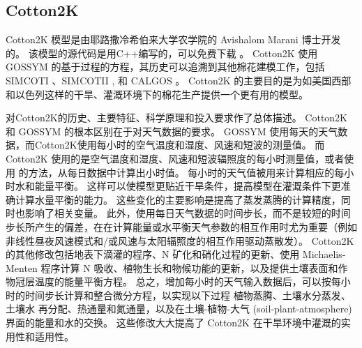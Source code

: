 \subsection{Cotton2K}
Cotton2K 模型是由耶路撒冷希伯来大学农学院的 Avishalom Marani 博士开发的。
该模型的源代码是用C++编写的，可以免费下载 \cite{cotton2kv4}。
Cotton2K 使用 GOSSYM \cite{baker1976,baker1983} 的基于过程的方程，其历史可以追溯到其他棉花建模工作，包括SIMCOTI \cite{baker1972}、SIMCOTII \cite{jones1974}, 和 CALGOS \cite{marani1992a,marani1992b,marani1992c}。
Cotton2K 的主要目的是为如美国西部和以色列这样的干旱、灌溉环境下的棉花生产提供一个更有用的模型。 

 对Cotton2K的历史、主要特征、科学原理和投入要求作了总体描述。
Cotton2K 和 GOSSYM 的根本区别在于对天气数据的要求。
GOSSYM 使用每天的天气数据，而Cotton2K使用每小时的空气温度和湿度、风速和短波的测量值。
而 Cotton2K 使用的是空气温度和湿度、风速和短波辐照度的每小时测量值，或者使用  的方法，从每日数据中计算出小时值。
每小时的天气值被用来计算相应的每小时水和能量平衡。
这样可以使模型更贴近干旱条件，提高模型在灌溉条件下更准确计算水量平衡的能力\cite{cotton2kv4}。
这些变化的主要影响是提高了蒸发蒸腾的计算精度，同时也影响了相关变量。
此外，使用每日天气数据的时间步长，而不是较短的时间步长所产生的偏差，在在计算能量或水平衡天气参数的相互作用时尤为重要（例如非线性昼夜风速模式和/或风速与太阳辐照度的相互作用驱动蒸散发）\cite{ephrath1996}。
Cotton2K 的其他修改包括地表下滴灌的程序、N 矿化和硝化过程的更新、使用 Michaelis-Menten 程序计算 N 吸收、植物生长和物候功能的更新，以及提供土壤表面和作物冠层温度的能量平衡方程\cite{cotton2kv4}。
总之，增加每小时的天气输入数据后，可以按每小时的时间步长计算和整合微分方程，以实现以下过程 植物蒸腾、土壤水分蒸发、土壤水 再分配、热通量和氮通量，以及在土壤-植物-大气 (soil-plant-atmosphere) 界面的能量和水的交换。
这些修改大大提高了 Cotton2K 在干旱环境中灌溉的实用性和适用性。

